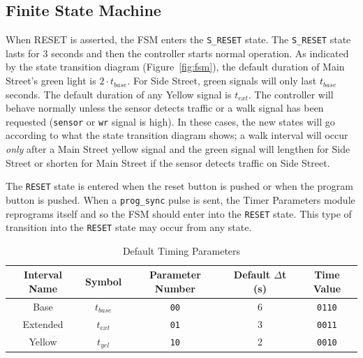 \documentclass[12pt]{article}
\begin{document}
	\subsection{Finite State Machine}
	When RESET is asserted, the FSM enters the \texttt{S\_RESET}
	state.
	The \texttt{S\_RESET} state lasts for 3 seconds and then
	the controller starts normal operation.  As indicated by the state
	transition diagram (Figure~\ref{fig:fsm}), the default duration of Main Street's
	green light is $2 \cdot t_{base}$.  For Side Street, green signals will
	only last $t_{base}$ seconds. The default duration of any Yellow signal
	is $t_{ext}$.  The controller will behave normally unless the sensor
	detects traffic or a walk signal has been requested (\texttt{sensor} or
	\texttt{wr} signal is high).  In these cases, the new states will go
	according to what the state transition diagram shows;  a walk interval
	will occur \emph{only} after a Main Street yellow signal and the green signal
	will lengthen for Side Street or shorten for Main Street if the sensor
	detects traffic on Side Street.

	The \texttt{RESET} state is entered when the reset button is pushed or
	when the program button is pushed.
	When a \texttt{prog\_sync} pulse is sent, the Timer Parameters module
	reprograms itself and so the FSM should enter into the \texttt{RESET}
	state.  This type of transition into the \texttt{RESET} state may occur
	from any state.
	
	\begin{table}
	\caption{Default Timing Parameters}
	\centering
		\begin{tabular}{|c|c|c|c|c|}
		\hline
		Interval Name & Symbol & Parameter Number & Default $\Delta$t (s) & Time Value \\ \hline
		Base & $t_{base}$ & \texttt{00} & 6 & \texttt{0110} \\ \hline
		Extended & $t_{ext}$ & \texttt{01} & 3 & \texttt{0011} \\ \hline
		Yellow & $t_{yel}$ & \texttt{10} & 2 & \texttt{0010} \\ \hline
		\end{tabular}
	\label{tbl:timeparam}
	\end{table}
\end{document}
